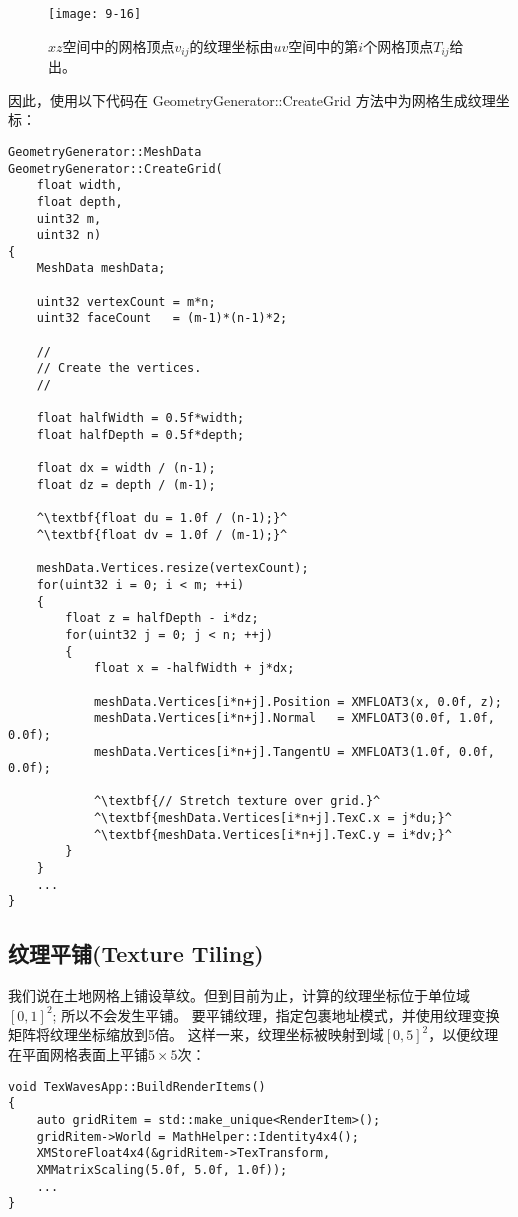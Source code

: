 \begin{figure}[h]
    \texttt{[image: 9-16]}
    \centering
    \caption{$xz$空间中的网格顶点$v_{ij}$的纹理坐标由$uv$空间中的第$i$个网格顶点$T_{ij}$给出。}
    \label{fig:9-16}
\end{figure}

\begin{flushleft}
因此，使用以下代码在 GeometryGenerator::CreateGrid 方法中为网格生成纹理坐标：\\
\end{flushleft}

\begin{lstlisting}[escapechar=^]
GeometryGenerator::MeshData 
GeometryGenerator::CreateGrid(
    float width,
    float depth,
    uint32 m,
    uint32 n)
{
    MeshData meshData;

    uint32 vertexCount = m*n;
    uint32 faceCount   = (m-1)*(n-1)*2;

    //
    // Create the vertices.
    //

    float halfWidth = 0.5f*width;
    float halfDepth = 0.5f*depth;

    float dx = width / (n-1);
    float dz = depth / (m-1);

    ^\textbf{float du = 1.0f / (n-1);}^
    ^\textbf{float dv = 1.0f / (m-1);}^

    meshData.Vertices.resize(vertexCount);
    for(uint32 i = 0; i < m; ++i)
    {
        float z = halfDepth - i*dz;
        for(uint32 j = 0; j < n; ++j)
        {
            float x = -halfWidth + j*dx;

            meshData.Vertices[i*n+j].Position = XMFLOAT3(x, 0.0f, z);
            meshData.Vertices[i*n+j].Normal   = XMFLOAT3(0.0f, 1.0f, 0.0f);
            meshData.Vertices[i*n+j].TangentU = XMFLOAT3(1.0f, 0.0f, 0.0f);

            ^\textbf{// Stretch texture over grid.}^
            ^\textbf{meshData.Vertices[i*n+j].TexC.x = j*du;}^
            ^\textbf{meshData.Vertices[i*n+j].TexC.y = i*dv;}^
        }
    }
    ...
}
\end{lstlisting}

\subsection{纹理平铺(Texture Tiling)}
\begin{flushleft}
我们说在土地网格上铺设草纹。但到目前为止，计算的纹理坐标位于单位域$[0,1]^{2}$; 所以不会发生平铺。 要平铺纹理，指定包裹地址模式，并使用纹理变换矩阵将纹理坐标缩放到5倍。 这样一来，纹理坐标被映射到域$[0,5]^{2}$，以便纹理在平面网格表面上平铺$5\times 5$次：\\
\end{flushleft}
\begin{lstlisting}
void TexWavesApp::BuildRenderItems()
{
    auto gridRitem = std::make_unique<RenderItem>();
    gridRitem->World = MathHelper::Identity4x4();
    XMStoreFloat4x4(&gridRitem->TexTransform,
    XMMatrixScaling(5.0f, 5.0f, 1.0f));
    ...
}
\end{lstlisting}

